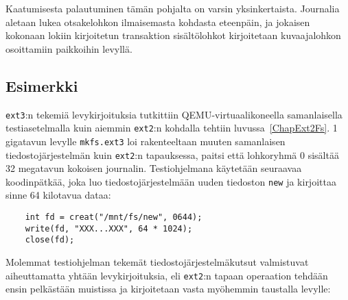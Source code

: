 Kaatumisesta palautuminen tämän pohjalta on varsin yksinkertaista.
Journalia aletaan lukea otsakelohkon ilmaisemasta kohdasta eteenpäin,
ja jokaisen kokonaan lokiin kirjoitetun transaktion sisältölohkot kirjoitetaan kuvaajalohkon osoittamiin paikkoihin levyllä.

\subsection{Esimerkki}
\texttt{ext3}:n tekemiä levykirjoituksia tutkittiin QEMU-virtuaalikoneella samanlaisella testiasetelmalla kuin aiemmin \texttt{ext2}:n kohdalla tehtiin luvussa~\ref{ChapExt2Fs}.
1 gigatavun levylle \texttt{mkfs.ext3} loi rakenteeltaan muuten samanlaisen tiedostojärjestelmän kuin \texttt{ext2}:n tapauksessa,
paitsi että lohkoryhmä 0 sisältää 32 megatavun kokoisen journalin.
Testiohjelmana käytetään seuraavaa koodinpätkää,
joka luo tiedostojärjestelmään uuden tiedoston \texttt{new} ja kirjoittaa sinne 64 kilotavua dataa:

\begin{verbatim}
    int fd = creat("/mnt/fs/new", 0644);
    write(fd, "XXX...XXX", 64 * 1024);
    close(fd);
\end{verbatim}

Molemmat testiohjelman tekemät tiedostojärjestelmäkutsut valmistuvat aiheuttamatta yhtään levykirjoituksia,
eli \texttt{ext2}:n tapaan operaation tehdään ensin pelkästään muistissa ja kirjoitetaan vasta myöhemmin taustalla levylle:

